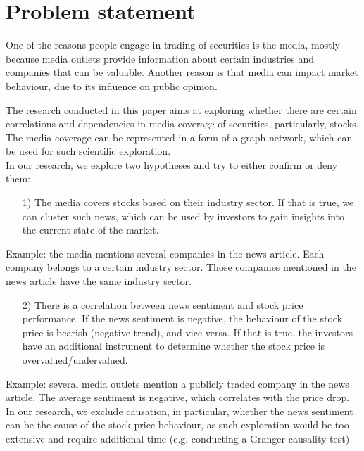 \chapter{Problem statement}
\label{cha:problem-statement}

One of the reasons people engage in trading of securities is the media, mostly because media outlets provide information about certain industries and companies that can be valuable. Another reason is that media can impact market behaviour, due to its influence on public opinion.

The research conducted in this paper aims at exploring whether there are certain correlations and dependencies in media coverage of securities, particularly, stocks. The media coverage can be represented in a form of a graph network, which can be used for such scientific exploration.
\\

\noindent In our research, we explore two hypotheses and try to either confirm or deny them:


\begin{itemize}
\item[1)] The media covers stocks based on their industry sector. If that is true, we can cluster such news, which can be used by investors to gain insights into the current state of the market.
\end{itemize}
Example: the media mentions several companies in the news article. Each company belongs to a certain industry sector. Those companies mentioned in the news article have the same industry sector.
\begin{itemize}
\item[2)] There is a correlation between news sentiment and stock price performance. If the news sentiment is negative, the behaviour of the stock price is bearish (negative trend), and vice versa. If that is true, the investors have an additional instrument to determine whether the stock price is overvalued/undervalued.
\end{itemize}
Example: several media outlets mention a publicly traded company in the news article. The average sentiment is negative, which correlates with the price drop.
In our research, we exclude causation, in particular, whether the news sentiment can be the cause of the stock price behaviour, as such exploration would be too extensive and require additional time (e.g. conducting a Granger-causality test)
